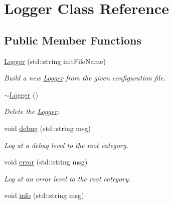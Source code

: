 \hypertarget{classLogger}{\section{Logger Class Reference}
\label{classLogger}
}
\subsection*{Public Member Functions}
\begin{DoxyCompactItemize}
\item 
\hypertarget{classLogger_adb1272641185c60ded6e973d7271c960}{\hyperlink{classLogger_adb1272641185c60ded6e973d7271c960}{Logger} (std\-::string init\-File\-Name)}\label{classLogger_adb1272641185c60ded6e973d7271c960}

\begin{DoxyCompactList}\small\item\em Build a new \hyperlink{classLogger}{Logger} from the given configuration file. \end{DoxyCompactList}\item 
\hypertarget{classLogger_acb668a9e186a25fbaad2e4af6d1ed00a}{\hyperlink{classLogger_acb668a9e186a25fbaad2e4af6d1ed00a}{$\sim$\-Logger} ()}\label{classLogger_acb668a9e186a25fbaad2e4af6d1ed00a}

\begin{DoxyCompactList}\small\item\em Delete the \hyperlink{classLogger}{Logger}. \end{DoxyCompactList}\item 
\hypertarget{classLogger_af1bdbe3c7f0afa9004071e870cf59db3}{void \hyperlink{classLogger_af1bdbe3c7f0afa9004071e870cf59db3}{debug} (std\-::string msg)}\label{classLogger_af1bdbe3c7f0afa9004071e870cf59db3}

\begin{DoxyCompactList}\small\item\em Log at a debug level to the root category. \end{DoxyCompactList}\item 
\hypertarget{classLogger_a5a5ae8bd2e452e9c844939fcaf5af790}{void \hyperlink{classLogger_a5a5ae8bd2e452e9c844939fcaf5af790}{error} (std\-::string msg)}\label{classLogger_a5a5ae8bd2e452e9c844939fcaf5af790}

\begin{DoxyCompactList}\small\item\em Log at an error level to the root category. \end{DoxyCompactList}\item 
\hypertarget{classLogger_aba0bf8a3ebff47c016a5732eda9fa5e6}{void \hyperlink{classLogger_aba0bf8a3ebff47c016a5732eda9fa5e6}{info} (std\-::string msg)}\label{classLogger_aba0bf8a3ebff47c016a5732eda9fa5e6}


\end{DoxyCompactItemize}
